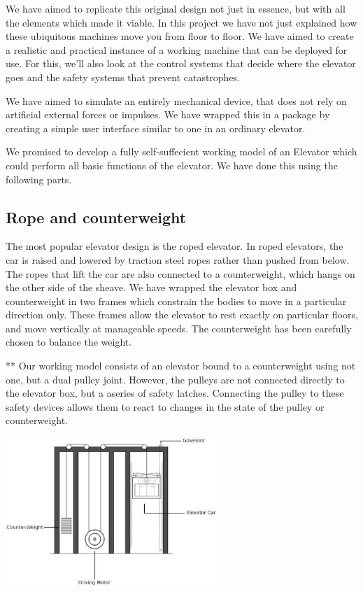 \documentclass[a4paper,11pt]{article}
\begin{document}
We have aimed to replicate this original design not just in essence, but with all the elements which made it viable.
In this project we have not just explained how these ubiquitous machines move you from floor to floor. We have aimed to create a realistic and practical instance of a working machine that can be deployed for use. For this, we'll also look at the control systems that decide where the elevator goes and the safety systems that prevent catastrophes.	

We have aimed to simulate an entirely mechanical device, that does not rely on artificial external forces or impulses. We have wrapped this in a package by creating a simple user interface similar to one in an ordinary elevator. 

We promised to develop a fully self-suffecient working model of an Elevator which could perform all basic functions of the elevator. We have done this using the following parts.

\subsection{Rope and counterweight}

The most popular elevator design is the roped elevator. In roped elevators, the car is raised and lowered by traction steel ropes rather than pushed from below. The ropes that lift the car are also connected to a counterweight, which hangs on the other side of the sheave. 
We have wrapped the elevator box and counterweight in two frames which constrain the bodies to move in a particular direction only.
These frames allow the elevator to rest exactly on particular floors, and move vertically at manageable speeds. The counterweight has been carefully chosen to balance the weight.

** Our working model consists of an elevator bound to a counterweight using not one, but a dual pulley joint. However, the pulleys are not connected directly to the elevator box, but a aseries of safety latches. Connecting the pulley to these safety devices allows them to react to changes in the state of the pulley or counterweight.


\begin{center}
\includegraphics[width=0.6\textwidth]{images/elevatorOrig.eps} 
\end{center}
\end{document}
